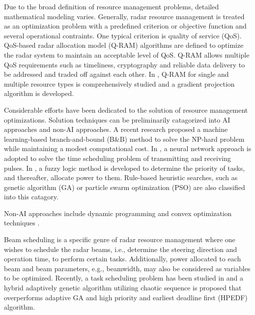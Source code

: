 \documentclass[12pt,journal,draftclsnofoot,onecolumn]{IEEEtran}
\begin{document}
Due to the broad definition of resource management problems, detailed mathematical modeling varies. Generally, radar resource management is treated as an optimization problem with a predefined criterion or objective function and several operational contraints. One typical criterion is quality of service (QoS)\cite{ghosh2006integrated}. QoS-based radar allocation model (Q-RAM) algorithms are defined to optimize the radar system to maintain an acceptable level of QoS. Q-RAM allows multiple QoS requirements such as timeliness, cryptography and reliable data delivery to be addressed and traded off against each other. In \cite{irci2010study}, Q-RAM for single and multiple resource types is comprehensively studied and a gradient projection algorithm is developed. 

Considerable efforts have been dedicated to the solution of resource management optimizations. Solution techniques can be preliminarily catagorized into AI approaches and non-AI approaches\cite{ding2008survey}. A recent research\cite{shaghaghi2018machine} proposed a machine learning-based branch-and-bound (B\&B) method to solve the NP-hard problem while maintaining a modest computational cost. In \cite{izquierdo1994optimal}, a neural network approach is adopted to solve the time scheduling problem of transmitting and receiving pulses. In \cite{miranda2007fuzzy,miranda2006knowledge}, a fuzzy logic method is  developed to determine the priority of tasks, and thereafter, allocate power to them. Rule-based heuristic searches, such as genetic algorithm (GA)\cite{zhang2019hybrid} or particle swarm optimization (PSO)\cite{zhang2011multiple} are also classified into this catagory.

Non-AI approaches include dynamic programming \cite{stromberg1996scheduling,castanon1997approximate,washburn2002stochastic} and convex optimization techniques \cite{boyd2004convex,li2020adaptive}.

Beam scheduling is a specific genre of radar resource management where one wishes to schedule the radar beams, i.e., determine the steering direction and operation time, to perform certain tasks. Additionally, power allocated to each beam and beam parameters, e.g., beamwidth, may also be considered as variables to be optimized. Recently, a task scheduling problem has been studied in \cite{zhang2019hybrid} and a hybrid adaptively genetic algorithm utilizing chaotic sequence is proposed that overperforms adaptive GA and high priority and earliest deadline first (HPEDF) algorithm.  
\end{document}
